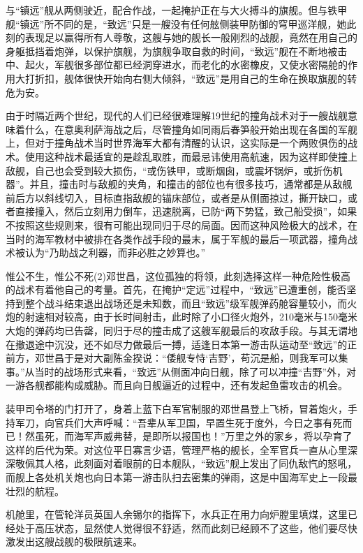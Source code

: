 \documentclass[12pt,UTF8]{ctexbook}
\begin{document}
与“镇远”舰从两侧驶近，配合作战，一起掩护正在与大火搏斗的旗舰。但与铁甲舰“镇远”所不同的是，“致远”只是一艘没有任何舷侧装甲防御的穹甲巡洋舰，她此刻的表现足以赢得所有人尊敬，这艘与她的舰长一般刚烈的战舰，竟然在用自己的身躯抵挡着炮弹，以保护旗舰，为旗舰争取自救的时间，“致远”舰在不断地被击中、起火，军舰很多部位都已经洞穿进水，而老化的水密橡皮，又使水密隔舱的作用大打折扣，舰体很快开始向右侧大倾斜，“致远”是用自己的生命在换取旗舰的转危为安。


由于时隔近两个世纪，现代的人们已经很难理解19世纪的撞角战术对于一艘战舰意味着什么，在意奥利萨海战之后，尽管撞角如同雨后春笋般开始出现在各国的军舰上，但对于撞角战术当时世界海军大都有清醒的认识，这实际是一个两败俱伤的战术。使用这种战术最适宜的是趁乱取胜，而最忌讳使用高航速，因为这样即使撞上敌舰，自己也会受到较大损伤，“或伤铁甲，或断烟囱，或震坏锅炉，或折伤机器”。并且，撞击时与敌舰的夹角，和撞击的部位也有很多技巧，通常都是从敌舰前后方以斜线切入，目标直指敌舰的锚床部位，或者是从侧面掠过，撕开缺口，或者直接撞入，然后立刻用力倒车，迅速脱离，已防“两下势猛，致己船受损”，如果不按照这些规则来，很有可能出现同归于尽的局面。因而这种风险极大的战术，在当时的海军教材中被排在各类作战手段的最末，属于军舰的最后一项武器，撞角战术被认为“乃助战之利器，而非必胜之妙算也。”

惟公不生，惟公不死(2)邓世昌，这位孤独的将领，此刻选择这样一种危险性极高的战术有着他自己的考量。首先，在掩护“定远”过程中，“致远”已遭重创，能否坚持到整个战斗结束退出战场还是未知数，而且“致远”级军舰弹药舱容量较小，而火炮的射速相对较高，由于长时间射击，此时除了小口径火炮外，210毫米与150毫米大炮的弹药均已告罄，同归于尽的撞击成了这艘军舰最后的攻敌手段。与其无谓地在撤退途中沉没，还不如尽力做最后一搏，适逢日本第一游击队运动至“致远”的正前方，邓世昌于是对大副陈金揆说：“倭舰专恃‘吉野’，苟沉是船，则我军可以集事。”从当时的战场形式来看，“致远”从侧面冲向日舰，除了可以冲撞“吉野”外，对一游各舰都能构成威胁。而且向日舰逼近的过程中，还有发起鱼雷攻击的机会。

装甲司令塔的门打开了，身着上蓝下白军官制服的邓世昌登上飞桥，冒着炮火，手持军刀，向官兵们大声呼喊：“吾辈从军卫国，早置生死于度外，今日之事有死而已！然虽死，而海军声威弗替，是即所以报国也！”万里之外的家乡，将以孕育了这样的后代为荣。对这位平日寡言少语，管理严格的舰长，全军官兵一直从心里深深敬佩其人格，此刻面对着眼前的日本舰队，“致远”舰上发出了同仇敌忾的怒吼，而舰上各处机关炮也向日本第一游击队扫去密集的弹雨，这是中国海军史上一段最壮烈的航程。

机舱里，在管轮洋员英国人余锡尔的指挥下，水兵正在用力向炉膛里填煤，这里已经处于高压状态，显然使人觉得很不舒适，然而此刻已经顾不了这些，他们要尽快激发出这艘战舰的极限航速来。
\end{document}
